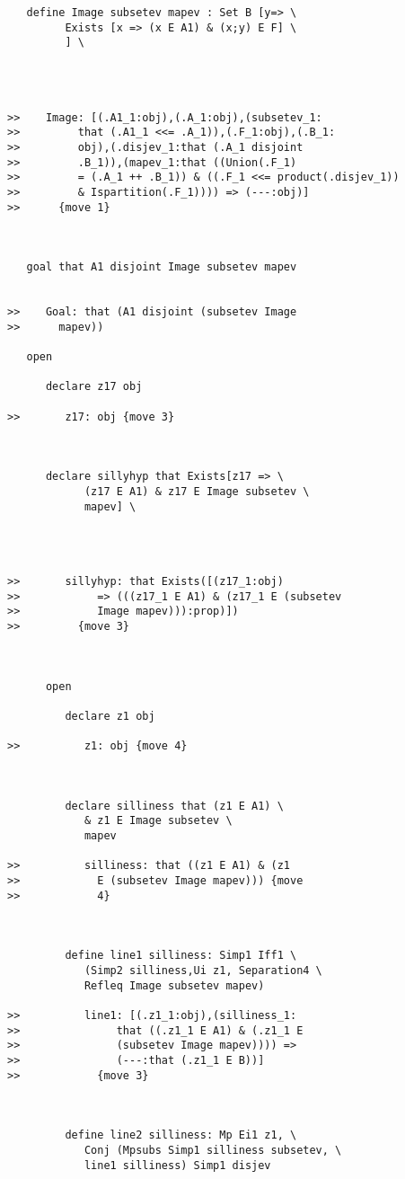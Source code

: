 \documentclass[12pt]{article}
\begin{document}
\begin{verbatim}
   define Image subsetev mapev : Set B [y=> \
         Exists [x => (x E A1) & (x;y) E F] \
         ] \
      



>>    Image: [(.A1_1:obj),(.A_1:obj),(subsetev_1:
>>         that (.A1_1 <<= .A_1)),(.F_1:obj),(.B_1:
>>         obj),(.disjev_1:that (.A_1 disjoint
>>         .B_1)),(mapev_1:that ((Union(.F_1)
>>         = (.A_1 ++ .B_1)) & ((.F_1 <<= product(.disjev_1))
>>         & Ispartition(.F_1)))) => (---:obj)]
>>      {move 1}



   goal that A1 disjoint Image subsetev mapev


>>    Goal: that (A1 disjoint (subsetev Image
>>      mapev))

   open

      declare z17 obj

>>       z17: obj {move 3}



      declare sillyhyp that Exists[z17 => \
            (z17 E A1) & z17 E Image subsetev \
            mapev] \
         



>>       sillyhyp: that Exists([(z17_1:obj)
>>            => (((z17_1 E A1) & (z17_1 E (subsetev
>>            Image mapev))):prop)])
>>         {move 3}



      open

         declare z1 obj

>>          z1: obj {move 4}



         declare silliness that (z1 E A1) \
            & z1 E Image subsetev \
            mapev

>>          silliness: that ((z1 E A1) & (z1
>>            E (subsetev Image mapev))) {move
>>            4}



         define line1 silliness: Simp1 Iff1 \
            (Simp2 silliness,Ui z1, Separation4 \
            Refleq Image subsetev mapev)

>>          line1: [(.z1_1:obj),(silliness_1:
>>               that ((.z1_1 E A1) & (.z1_1 E
>>               (subsetev Image mapev)))) =>
>>               (---:that (.z1_1 E B))]
>>            {move 3}



         define line2 silliness: Mp Ei1 z1, \
            Conj (Mpsubs Simp1 silliness subsetev, \
            line1 silliness) Simp1 disjev


\end{verbatim}
\end{document}
